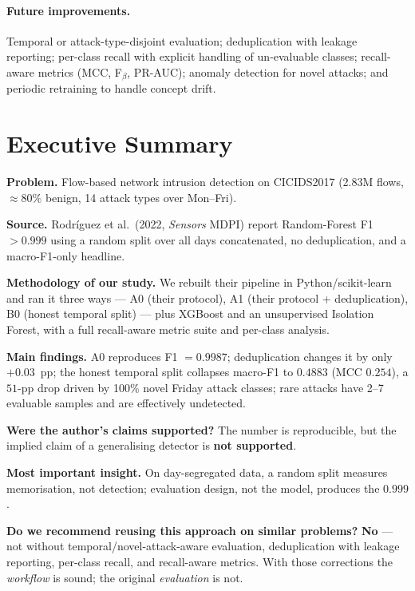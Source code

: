 \documentclass[11pt,a4paper]{article}
\begin{document}
\paragraph{Future improvements.} Temporal or attack-type-disjoint evaluation; deduplication
with leakage reporting; per-class recall with explicit handling of un-evaluable classes;
recall-aware metrics (MCC, F$_\beta$, PR-AUC); anomaly detection for novel attacks; and
periodic retraining to handle concept drift.

\section{Executive Summary}
\textbf{Problem.} Flow-based network intrusion detection on CICIDS2017 (2.83M flows,
$\approx 80\%$ benign, 14 attack types over Mon--Fri).

\textbf{Source.} Rodr\'iguez et al.\ (2022, \emph{Sensors} MDPI) report Random-Forest
F1 $>0.999$ using a random split over all days concatenated, no deduplication, and a
macro-F1-only headline.

\textbf{Methodology of our study.} We rebuilt their pipeline in Python/scikit-learn and ran it
three ways --- A0 (their protocol), A1 (their protocol + deduplication), B0 (honest temporal
split) --- plus XGBoost and an unsupervised Isolation Forest, with a full recall-aware metric
suite and per-class analysis.

\textbf{Main findings.} A0 reproduces F1 $=0.9987$; deduplication changes it by only
$+0.03$~pp; the honest temporal split collapses macro-F1 to $0.4883$ (MCC $0.254$), a
$51$-pp drop driven by 100\% novel Friday attack classes; rare attacks have 2--7 evaluable
samples and are effectively undetected.

\textbf{Were the author's claims supported?} The number is reproducible, but the implied claim
of a generalising detector is \textbf{not supported}.

\textbf{Most important insight.} On day-segregated data, a random split measures memorisation,
not detection; evaluation design, not the model, produces the $0.999$.

\textbf{Do we recommend reusing this approach on similar problems?} \textbf{No} --- not without
temporal/novel-attack-aware evaluation, deduplication with leakage reporting, per-class recall,
and recall-aware metrics. With those corrections the \emph{workflow} is sound; the original
\emph{evaluation} is not.
\end{document}
